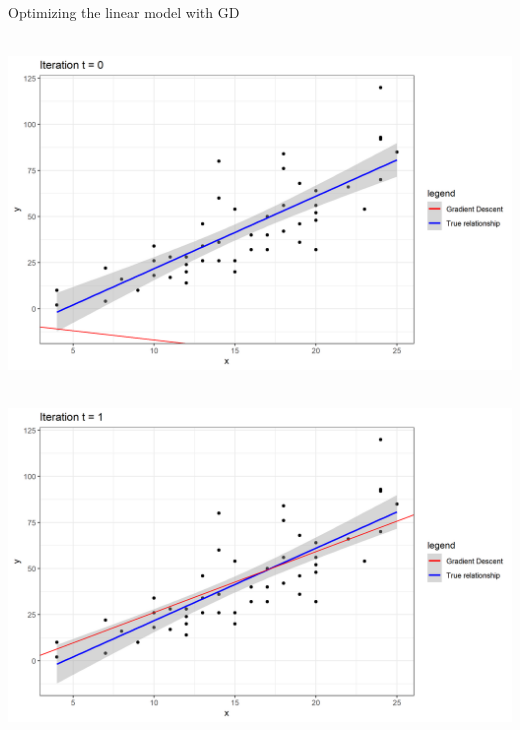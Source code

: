 \documentclass[11pt,compress,t,notes=noshow, xcolor=table]{beamer}
\begin{document}
\begin{vbframe}{Optimizing the linear model with GD}
	\framebreak
	
	
	\begin{center}
	$ $ \\
	\includegraphics[width=\textwidth]{figure_man/iter0.png}\\
	\begin{footnotesize}
	\end{footnotesize}
	\end{center}


	
	\framebreak
	
	\begin{center}
	$ $ \\
	\includegraphics[width=\textwidth]{figure_man/iter1.png}\\
	\begin{footnotesize}
	\end{footnotesize}
	\end{center}
	
	\framebreak
	

\end{vbframe}
\end{document}
